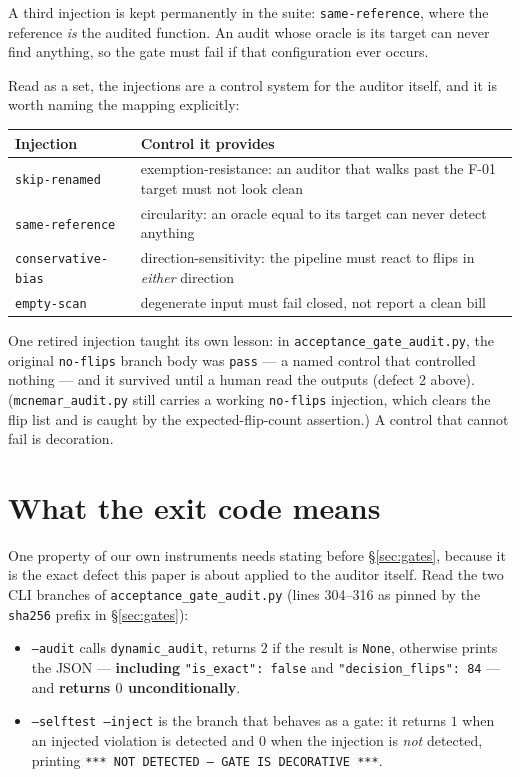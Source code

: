 \documentclass[10pt]{article}
\newcommand{\code}[1]{\texttt{#1}}
\begin{document}
A third injection is kept permanently in the suite: \code{same-reference},
where the reference \emph{is} the audited function. An audit whose oracle is
its target can never find anything, so the gate must fail if that
configuration ever occurs.

Read as a set, the injections are a control system for the auditor itself,
and it is worth naming the mapping explicitly:

\begin{center}
\small
\begin{tabular}{lp{7.2cm}}
\toprule
Injection & Control it provides \\
\midrule
\code{skip-renamed} & exemption-resistance: an auditor that walks past the
F-01 target must not look clean \\
\code{same-reference} & circularity: an oracle equal to its target can never
detect anything \\
\code{conservative-bias} & direction-sensitivity: the pipeline must react to
flips in \emph{either} direction \\
\code{empty-scan} & degenerate input must fail closed, not report a clean
bill \\
\bottomrule
\end{tabular}
\end{center}

\noindent One retired injection taught its own lesson: in
\code{acceptance\_gate\_audit.py}, the original \code{no-flips} branch body was
\code{pass} --- a named control that controlled nothing --- and it survived
until a human read the outputs (defect 2 above). (\code{mcnemar\_audit.py}
still carries a working \code{no-flips} injection, which clears the flip list
and is caught by the expected-flip-count assertion.) A control that cannot fail
is decoration.

\section{What the exit code means}\label{sec:semantics}

One property of our own instruments needs stating before \S\ref{sec:gates},
because it is the exact defect this paper is about applied to the auditor
itself. Read the two CLI branches of
\code{acceptance\_gate\_audit.py} (lines 304--316 as pinned by the
\code{sha256} prefix in \S\ref{sec:gates}):

\begin{itemize}
  \item \code{--audit} calls \code{dynamic\_audit}, returns $2$ if the result
  is \code{None}, otherwise prints the JSON --- \textbf{including}
  \code{"is\_exact": false} and \code{"decision\_flips": 84} --- and
  \textbf{returns $0$ unconditionally}.
  \item \code{--selftest --inject} is the branch that behaves as a gate: it
  returns $1$ when an injected violation is detected and $0$ when the
  injection is \emph{not} detected, printing
  \code{*** NOT DETECTED --- GATE IS DECORATIVE ***}.
\end{itemize}
\end{document}
